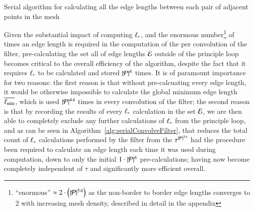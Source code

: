 \begin{algorithm}[ht]
	\DontPrintSemicolon


	\bigskip
\nl	{}
	\caption{Serial algorithm for calculating all the edge lengths between each pair of adjacent points in the mesh\label{alg:serialCalculateEdgeLengths}}
\end{algorithm}

Given the substantial impact of computing ${\ell_\ast}$, and the enormous number\footnote{``enormous'' $\approx2\cdot\left (|\mathcal{P}|^{5\,\bar{n}}\right )$ as the non-border to border edge lengths converges to 2 with increasing mesh density, described in detail in the appendix} of times an edge length is required in the computation of the  per convolution of the filter, pre-calculating the set all of edge lengths $\mathcal{E}$ outside of the principle loop becomes critical to the overall efficiency of the algorithm, despite the fact that it requires ${\ell_\ast}$ to be calculated and stored $|\mathcal{P}|^{\bar{n}}$ times. It is of paramount importance for two reasons: the first reason is that without pre-calcuating every edge length, it would be otherwise impossible to calculate the global minimum edge length $\overline{\ell_\text{min}}$, which is used $|\mathcal{P}|^{4\,\bar{n}}$ times in every convolution of the filter; the second reason is that by recording the results of every $\ell_\ast$ calculation in the set $\mathcal{E}$, we are then able to completely exclude any further calculations of $\ell_\ast$ from the principle loop, and as can be seen in Algorithm~\ref{alg:serialConvolveFilter}, that reduces the total count of $\ell_\ast$ calculations performed by the filter from the $\tau^{|\mathcal{P}|^{3\,\bar{n}}}$ had the procedure been required to calculate an edge length each time it was used during computation, down to only the initial $1\cdot |\mathcal{P}|^{\bar{n}}$ pre-calculations; having now become completely independent of $\tau$ and significantly more efficient overall.%
%


